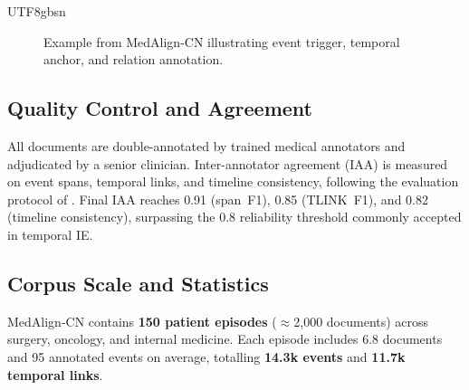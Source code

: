\documentclass[11pt]{article}
\begin{document}
\begin{CJK*}{UTF8}{gbsn}
\begin{figure}[t]
\centering
{}
\caption{Example from MedAlign-CN illustrating event trigger, temporal anchor, and relation annotation.}
\label{fig:cn_example}
\vspace{-0.5em}
\end{figure}

\subsection{Quality Control and Agreement}
All documents are double-annotated by trained medical annotators and adjudicated by a senior clinician. Inter-annotator agreement (IAA) is measured on event spans, temporal links, and timeline consistency, following the evaluation protocol of \cite{lin2023temptime}. Final IAA reaches 0.91 (span~F1), 0.85 (TLINK~F1), and 0.82 (timeline consistency), surpassing the 0.8 reliability threshold commonly accepted in temporal IE.

\subsection{Corpus Scale and Statistics}
MedAlign-CN contains \textbf{150 patient episodes} ($\approx$2{,}000 documents) across surgery, oncology, and internal medicine. Each episode includes 6.8 documents and 95 annotated events on average, totalling \textbf{14.3k events} and \textbf{11.7k temporal links}.

\setlength{\tabcolsep}{4pt}
\begin{table}[t]
\centering
{}
\caption{Corpus statistics and inter-annotator agreement (IAA).}
\label{tab:medalign_stats}
\end{table}


\end{CJK*}
\end{document}
